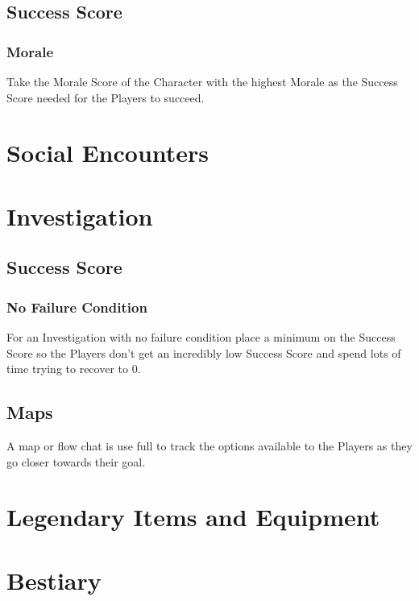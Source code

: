 \documentclass[a4paper,12pt,oneside]{book}
\begin{document}
            \subsection{Success Score}
                \subsubsection{Morale}
                    Take the Morale Score of the Character with the highest Morale as the Success Score needed for the Players to succeed.
        \section{Social Encounters}

        \section{Investigation}
            \subsection{Success Score}
                \subsubsection{No Failure Condition}
                    For an Investigation with no failure condition place a minimum on the Success Score so the Players don't get an incredibly low Success Score and spend lots of time trying to recover to 0.

            \subsection{Maps}
                A map or flow chat is use full to track the options available to the Players as they go closer towards their goal.

        \section{Legendary Items and Equipment}
        \section{Bestiary}


    \appendix

    \backmatter
    {}
    
    \printindex
\end{document}
